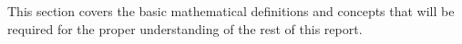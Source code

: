 \documentclass[../../main.tex]{subfiles}
\begin{document}
This section covers the basic mathematical definitions and concepts that will be required for the proper understanding of the rest of this report.
\end{document}
